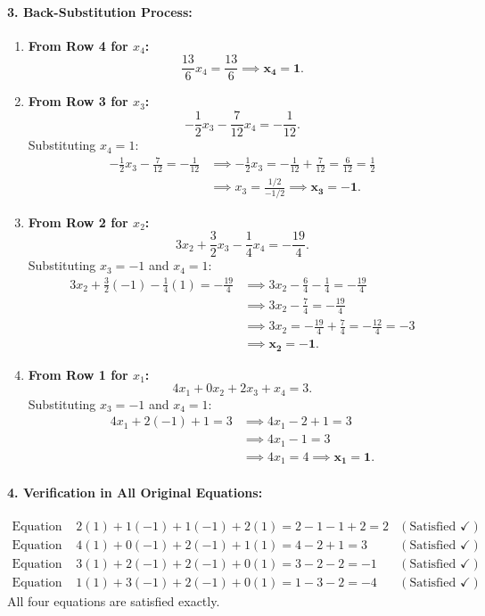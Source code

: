 \documentclass[11pt,a4paper]{article}
\begin{document}
\paragraph{3. Back-Substitution Process:}
\begin{enumerate}[label=\textbf{Step \arabic*:}, leftmargin=2cm]
    \item \textbf{From Row 4 for $x_4$:}
    \[
    \frac{13}{6}x_4 = \frac{13}{6} \implies \mathbf{x_4 = 1}.
    \]

    \item \textbf{From Row 3 for $x_3$:}
    \[
    -\frac{1}{2}x_3 - \frac{7}{12}x_4 = -\frac{1}{12}.
    \]
    Substituting $x_4 = 1$:
    \begin{align*}
    -\frac{1}{2}x_3 - \frac{7}{12} = -\frac{1}{12} &\implies -\frac{1}{2}x_3 = -\frac{1}{12} + \frac{7}{12} = \frac{6}{12} = \frac{1}{2} \\
    &\implies x_3 = \frac{1/2}{-1/2} \implies \mathbf{x_3 = -1}.
    \end{align*}

    \item \textbf{From Row 2 for $x_2$:}
    \[
    3x_2 + \frac{3}{2}x_3 - \frac{1}{4}x_4 = -\frac{19}{4}.
    \]
    Substituting $x_3 = -1$ and $x_4 = 1$:
    \begin{align*}
    3x_2 + \frac{3}{2}(-1) - \frac{1}{4}(1) = -\frac{19}{4} &\implies 3x_2 - \frac{6}{4} - \frac{1}{4} = -\frac{19}{4} \\
    &\implies 3x_2 - \frac{7}{4} = -\frac{19}{4} \\
    &\implies 3x_2 = -\frac{19}{4} + \frac{7}{4} = -\frac{12}{4} = -3 \\
    &\implies \mathbf{x_2 = -1}.
    \end{align*}

    \item \textbf{From Row 1 for $x_1$:}
    \[
    4x_1 + 0x_2 + 2x_3 + x_4 = 3.
    \]
    Substituting $x_3 = -1$ and $x_4 = 1$:
    \begin{align*}
    4x_1 + 2(-1) + 1 = 3 &\implies 4x_1 - 2 + 1 = 3 \\
    &\implies 4x_1 - 1 = 3 \\
    &\implies 4x_1 = 4 \implies \mathbf{x_1 = 1}.
    \end{align*}
\end{enumerate}

\paragraph{4. Verification in All Original Equations:}
\begin{align*}
\text{Equation 1: } & 2(1) + 1(-1) + 1(-1) + 2(1) = 2 - 1 - 1 + 2 = 2 & (\text{Satisfied } \checkmark) \\
\text{Equation 2: } & 4(1) + 0(-1) + 2(-1) + 1(1) = 4 - 2 + 1 = 3 & (\text{Satisfied } \checkmark) \\
\text{Equation 3: } & 3(1) + 2(-1) + 2(-1) + 0(1) = 3 - 2 - 2 = -1 & (\text{Satisfied } \checkmark) \\
\text{Equation 4: } & 1(1) + 3(-1) + 2(-1) + 0(1) = 1 - 3 - 2 = -4 & (\text{Satisfied } \checkmark)
\end{align*}
All four equations are satisfied exactly.
\end{document}
